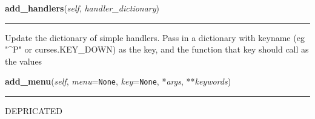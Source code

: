     \label{npyscreen:widget:InputHandler:add_handlers}

    \vspace{0.5ex}

    \begin{boxedminipage}{\textwidth}

    \raggedright \textbf{add\_handlers}(\textit{self}, \textit{handler\_dictionary})

    \vspace{-1.5ex}

    \rule{\textwidth}{0.5\fboxrule}
    Update the dictionary of simple handlers.  Pass in a dictionary with 
    keyname (eg "{\textasciicircum}P" or curses.KEY\_DOWN) as the key, and 
    the function that key should call as the values

    \vspace{1ex}

    \end{boxedminipage}

    \label{npyscreen:Form:Form:add_menu}
    
    \vspace{0.5ex}

    \begin{boxedminipage}{\textwidth}

    \raggedright \textbf{add\_menu}(\textit{self}, \textit{menu}=\texttt{None}, \textit{key}=\texttt{None}, *\textit{args}, **\textit{keywords})

    \vspace{-1.5ex}

    \rule{\textwidth}{0.5\fboxrule}
    DEPRICATED

    \vspace{1ex}

    \end{boxedminipage}

    \label{npyscreen:Form:Form:add}
    
    \vspace{0.5ex}

